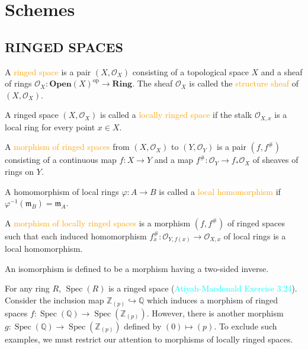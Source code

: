 \chapter{Schemes}

\section*{RINGED SPACES}

\begin{definition}
	A \textcolor{orange}{ringed space} is a pair $\left(X,\mathcal{O}_X\right)$ consisting of a topological space $X$ and a sheaf of rings $\mathcal{O}_X:\mathbf{Open}(X)^\text{op}\rightarrow\mathbf{Ring}$. The sheaf $\mathcal{O}_X$ is called the \textcolor{orange}{structure sheaf} of $\left(X,\mathcal{O}_X\right)$.
	
	A ringed space $\left(X,\mathcal{O}_X\right)$ is called a \textcolor{orange}{locally ringed space} if the stalk $\mathcal{O}_{X,x}$ is a local ring for every point $x\in X$.
\end{definition}

\begin{definition}
	A \textcolor{orange}{morphism of ringed spaces} from $\left(X,\mathcal{O}_X\right)$ to $\left(Y,\mathcal{O}_Y\right)$ is a pair $\left(f,f^\#\right)$ consisting of a continuous map $f:X\rightarrow Y$ and a map $f^\#:\mathcal{O}_Y\rightarrow f_*\mathcal{O}_X$ of sheaves of rings on $Y$.
	
	A homomorphism of local rings $\varphi:A\rightarrow B$ is called a \textcolor{orange}{local homomorphism} if $\varphi^{-1}\!\left(\mathfrak{m}_B\right)=\mathfrak{m}_A$.
	
	A \textcolor{orange}{morphism of locally ringed spaces} is a morphism $\left(f,f^\#\right)$ of ringed spaces such that each induced homomorphism $f^\#_x:\mathcal{O}_{Y,f(x)}\rightarrow\mathcal{O}_{X,x}$ of local rings is a local homomorphism.
	
	An isomorphism is defined to be a morphism having a two-sided inverse.
\end{definition}

For any ring $R$, $\operatorname{Spec}(R)$ is a ringed space (\textcolor{cyan}{Atiyah-Macdonald Exercise 3.24}). Consider the inclusion map $\mathbb{Z}_{(p)}\hookrightarrow\mathbb{Q}$ which induces a morphism of ringed spaces $f:\operatorname{Spec}(\mathbb{Q})\rightarrow\operatorname{Spec}\!\left(\mathbb{Z}_{(p)}\right)$. However, there is another morphism $g:\operatorname{Spec}(\mathbb{Q})\rightarrow\operatorname{Spec}\!\left(\mathbb{Z}_{(p)}\right)$ defined by $(0)\mapsto(p)$. To exclude such examples, we must restrict our attention to morphisms of locally ringed spaces.

